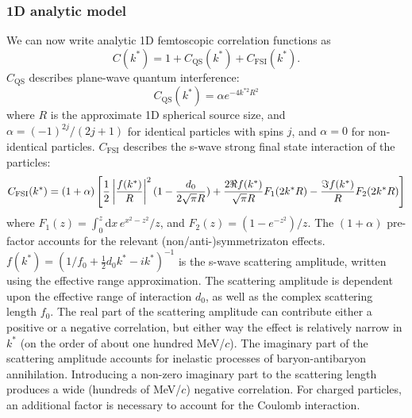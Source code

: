 



\subsubsection{1D analytic model}
\label{sec:AnalyticModel}


We can now write analytic 1D femtoscopic correlation functions as
\begin{equation}
\label{eq:GeneralCorrelationFunction}
C(k^*)= 1 + C_{\mathrm{QS}}(k^*)+C_{\mathrm{FSI}}(k^*).
\end{equation}
$C_{\mathrm{QS}}$ describes plane-wave quantum interference:
\begin{equation}
C_{\mathrm{QS}}(k^*) = \alpha e^{-4k^{*2}R^2}
\end{equation}
where $R$ is the approximate 1D spherical source size, and $\alpha = (-1)^{2j}/(2j+1)$ for identical particles with spins $j$, and $\alpha = 0$ for non-identical particles.
$C_{\mathrm{FSI}}$ describes the s-wave strong final state interaction of the particles:
\begin{equation}
\label{eq:Lednicky}
C_{\mathrm{FSI}}(k^*)= (1+\alpha)\left[\frac{1}{2}\left\lvert\frac{f(k^*)}{R}\right\rvert^2(1-\frac{d_0}{2\sqrt{\pi}R})+\frac{2\Re f(k^*)}{\sqrt{\pi}R}F_1(2k^*R)-\frac{\Im f(k^*)}{R}F_2(2k^*R)\right]
\end{equation}
where $F_1(z) = \int_0^z \! \mathrm{d}x \, e^{x^2-z^2}/z$, and $F_2(z) = (1-e^{-z^2})/z$.
The $(1+\alpha)$ pre-factor accounts for the relevant (non/anti-)symmetrizaton effects.
$f(k^*)=(1/f_0+\frac{1}{2}d_0k^*-ik^*)^{-1}$ is the s-wave scattering amplitude, written using the effective range approximation.
The scattering amplitude is dependent upon the effective range of interaction $d_0$, as well as the complex scattering length $f_0$.  
The real part of the scattering amplitude can contribute either a positive or a negative correlation, but either way the effect is relatively narrow in $k^*$ (on the order of about one hundred MeV/$c$).  
The imaginary part of the scattering amplitude accounts for inelastic processes of baryon-antibaryon annihilation.  
Introducing a non-zero imaginary part to the scattering length produces a wide (hundreds of MeV/$c$) negative correlation.  
For charged particles, an additional factor \cite{Aamodt:2011kd} is necessary to account for the Coulomb interaction.

